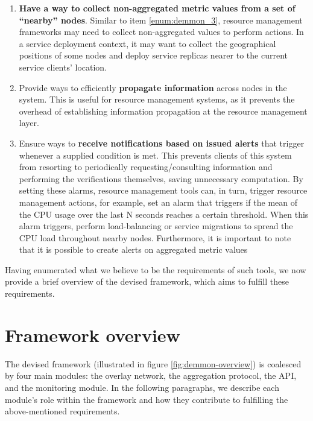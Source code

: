 \begin{enumerate}
    \item \textbf{Have a way to collect non-aggregated metric values from a set of ``nearby'' nodes}. Similar to item \ref{enum:demmon_3}, resource management frameworks may need to collect non-aggregated values to perform actions. In a service deployment context, it may want to collect the geographical positions of some nodes and deploy service replicas nearer to the current service clients' location. \label{enum:demmon_7}
    
    \item Provide ways to efficiently \textbf{propagate information} across nodes in the system. This is useful for resource management systems, as it prevents the overhead of establishing information propagation at the resource management layer. \label{enum:demmon_5}
    
    \item Ensure ways to \textbf{receive notifications based on issued alerts} that trigger whenever a supplied condition is met. This prevents clients of this system from resorting to periodically requesting/consulting information and performing the verifications themselves, saving unnecessary computation. By setting these alarms, resource management tools can, in turn, trigger resource management actions, for example, set an alarm that triggers if the mean of the CPU usage over the last N seconds reaches a certain threshold. When this alarm triggers, perform load-balancing or service migrations to spread the CPU load throughout nearby nodes. Furthermore, it is important to note that it is possible to create alerts on aggregated metric values \label{enum:demmon_6}
    
\end{enumerate}

Having enumerated what we believe to be the requirements of such tools, we now provide a brief overview of the devised framework, which aims to fulfill these requirements. 

\section{Framework overview}
\label{sec:framework_overview}


The devised framework (illustrated in figure \ref{fig:demmon-overview}) is coalesced by four main modules: the overlay network, the aggregation protocol, the API, and the monitoring module. In the following paragraphs, we describe each module's role within the framework and how they contribute to fulfilling the above-mentioned requirements.

